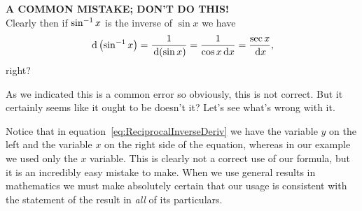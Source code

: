 \begin{myexample}{{\bf A COMMON MISTAKE; DON'T DO THIS!}}\\
\noindent{}  Clearly then if $\sin^{-1} x$ is the inverse of $\sin x$ we have
  \[
  \thinspace{\rm d}\left(\sin^{-1} x\right) = \frac{1}{\thinspace{\rm d}(\sin x)}= \frac{1}{\cos
    x\thinspace{\rm d}x}= \frac{\sec x}{\thinspace{\rm d}x},
  \] right?

As we indicated this is a common error so obviously, this is not
correct. But it certainly seems like it ought to be doesn't it? Let's
see what's wrong with it.



\end{myexample}

Notice that in
equation~\ref{eq:ReciprocalInverseDeriv} we have the variable $y$ on
the left and the variable $x$ on the right side of the equation,
whereas in our example we used only the $x$ variable. This is clearly
not a correct use of our formula, but it is an incredibly easy mistake
to make. When we use general results in mathematics we must make
absolutely certain that our usage is consistent with the statement
of the result in \emph{all} of its particulars.

